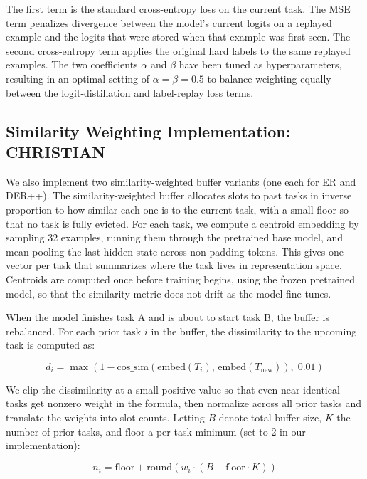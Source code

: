 \documentclass{article}
\begin{document}
The first term is the standard cross-entropy loss on the current task. The
MSE term penalizes divergence between the model's current logits on a
replayed example and the logits that were stored when that example was first
seen. The second cross-entropy term applies the original hard labels to the
same replayed examples. The two coefficients $\alpha$ and $\beta$ have been
tuned as hyperparameters, resulting in an optimal setting of $\alpha = \beta =
0.5$ to balance weighting equally between the logit-distillation and
label-replay loss terms.

\subsection{Similarity Weighting Implementation: CHRISTIAN}
We also implement two similarity-weighted buffer variants (one each for ER
and DER++). The similarity-weighted buffer allocates slots to past tasks in
inverse proportion to how similar each one is to the current task, with a
small floor so that no task is fully evicted. For each task, we compute a
centroid embedding by sampling 32 examples, running them through the
pretrained base model, and mean-pooling the last hidden state across
non-padding tokens. This gives one vector per task that summarizes where the
task lives in representation space. Centroids are computed once before
training begins, using the frozen pretrained model, so that the similarity
metric does not drift as the model fine-tunes.

When the model finishes task A and is about to start task B, the buffer is
rebalanced. For each prior task $i$ in the buffer, the dissimilarity to the
upcoming task is computed as:

\begin{equation}
		d_i = \max\!\left(1 - \mathrm{cos\_sim}\!\left(\mathrm{embed}(T_i),\,
		\mathrm{embed}(T_{\text{new}})\right),\; 0.01\right)
\end{equation}

We clip the dissimilarity at a small positive value so that even
near-identical tasks get nonzero weight in the formula, then normalize across
all prior tasks and translate the weights into slot counts. Letting $B$ denote
total buffer size, $K$ the number of prior tasks, and $\text{floor}$ a
per-task minimum (set to 2 in our implementation):

\begin{equation}
		n_i = \text{floor} + \mathrm{round}\!\left(w_i \cdot (B - \text{floor} \cdot K)\right)
\end{equation}
\end{document}
